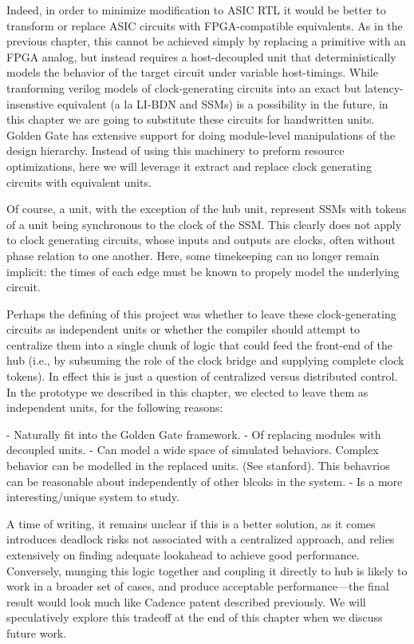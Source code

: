 Indeed, in order to minimize modification to ASIC RTL it would be better to transform or
replace ASIC circuits with FPGA-compatible equivalents. As in the previous
chapter, this cannot be achieved simply by replacing a primitive with an FPGA
analog, but instead requires a host-decoupled unit that deterministically
models the behavior of the target circuit under variable host-timings.  While
tranforming verilog models of clock-generating circuits into an exact but
latency-insenstive equivalent (a la LI-BDN and SSMs) is a possibility in the
future, in this chapter we are going to substitute these circuits for
handwritten units. Golden Gate has extensive support for doing module-level
manipulations of the design hierarchy.  Instead of using this machinery to
preform resource optimizations, here we will leverage it extract and replace
clock generating circuits with equivalent units.

Of course, a unit, with the exception of the hub unit, represent SSMs with
tokens of a unit being synchronous to the clock of the SSM. This clearly does
not apply to clock generating circuits, whose inputs and outputs are
clocks, often without phase relation to one another. Here, some timekeeping can
no longer remain implicit: the times of each edge must be known to propely
model the underlying circuit.

Perhaps the defining of this project was whether to leave these
clock-generating circuits as independent units or whether the
compiler should attempt to centralize them into a single chunk of logic that could
feed the front-end of the hub (i.e., by subsuming the role of the clock bridge
and supplying complete clock tokens). In effect this is just a question of
centralized versus distributed control.  In the prototype we described in this
chapter, we elected to leave them as independent units, for the following
reasons:

- Naturally fit into the Golden Gate framework.
 - Of replacing modules with decoupled units.
- Can model a wide space of simulated behaviors. Complex behavior can be modelled in the replaced units. (See stanford).
  This behavrios can be reasonable about independently of other blcoks in the system. 
- Is a more interesting/unique system to study.

A time of writing, it remains unclear if this is a better solution, as it comes
introduces deadlock risks not associated with a centralized approach, and
relies extensively on finding adequate lookahead to achieve good performance.
Conversely, munging this logic together and coupling it directly to hub is
likely to work in a broader set of cases, and produce acceptable
performance---the final result would look much like Cadence patent described
previously.  We will speculatively explore this tradeoff at the end of this
chapter when we discuss future work.



